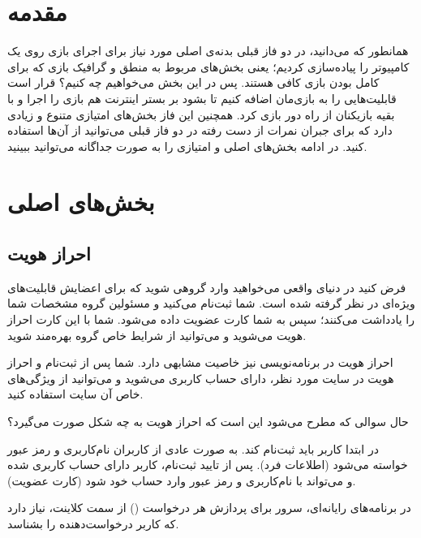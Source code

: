 \documentclass[]{article}
\begin{document}
\newpage

\section*{{\titr مقدمه}}

همانطور که می‌دانید، در دو فاز قبلی بدنه‌ی اصلی مورد نیاز برای اجرای بازی روی یک کامپیوتر را پیاده‌سازی کردیم؛ یعنی بخش‌های مربوط به منطق و گرافیک بازی که برای کامل بودن بازی کافی هستند. پس در این بخش می‌خواهیم چه کنیم؟ قرار است قابلیت‌هایی را به بازی‌مان اضافه کنیم تا بشود بر بستر اینترنت هم بازی را اجرا و با بقیه بازیکنان از راه دور بازی کرد. همچنین این فاز بخش‌های امتیازی متنوع و زیادی دارد که برای جبران نمرات از دست‌ رفته در دو فاز قبلی می‌توانید از آن‌ها استفاده کنید. در ادامه بخش‌های اصلی و امتیازی را به صورت جداگانه می‌توانید ببینید.

\section*{{\titr بخش‌های اصلی}}

\subsection*{{\titr احراز هویت}}

فرض کنید در دنیای واقعی می‌خواهید وارد گروهی شوید که برای اعضایش قابلیت‌های ویژه‌ای در نظر گرفته شده است. شما ثبت‌نام می‌کنید و مسئولین گروه مشخصات شما را یادداشت می‌کنند؛ سپس به شما کارت عضویت داده می‌شود. شما با این کارت احراز هویت می‌شوید و می‌توانید از شرایط خاص گروه بهره‌مند شوید.

احراز هویت در برنامه‌نویسی نیز خاصیت مشابهی دارد. شما پس از ثبت‌نام و احراز هویت در سایت مورد نظر، دارای حساب کاربری می‌شوید و می‌توانید از ویژگی‌های خاص آن سایت استفاده کنید.

حال سوالی که مطرح می‌شود این است که احراز هویت به چه شکل صورت می‌گیرد؟

در ابتدا کاربر باید ثبت‌نام کند. به صورت عادی از کاربران نام‌کاربری و رمز عبور خواسته می‌شود (اطلاعات فرد). پس از تایید ثبت‌نام، کاربر دارای حساب کاربری شده و می‌تواند با نام‌کاربری و رمز عبور وارد حساب خود شود (کارت عضویت).

در برنامه‌‌های رایانه‌ای، سرور برای پردازش هر درخواست () از سمت کلاینت، نیاز دارد که کاربر درخواست‌دهنده را بشناسد.
\end{document}
